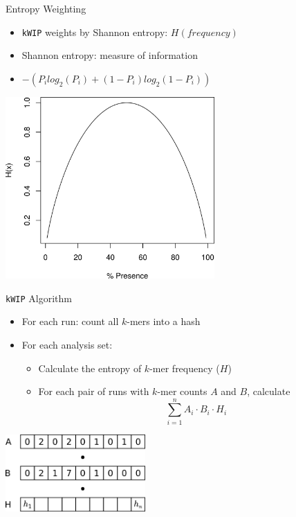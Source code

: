 \documentclass[t]{beamer}
\begin{document}
\begin{frame}{Entropy Weighting}
  \begin{itemize}
    \item \texttt{kWIP} weights by Shannon entropy: $H(frequency)$
    \item Shannon entropy: measure of information
    \item $-(P_i log_2(P_i) + (1-P_i) log_2(1-P_i))$
  \end{itemize}
  \begin{center}
    \includegraphics[width=0.6\textwidth]{img/shanent.png}
  \end{center}
\end{frame}

\begin{frame}{\texttt{kWIP} Algorithm}
  \begin{itemize}
    \item For each run: count all $k$-mers into a hash
    \item For each analysis set:
      \begin{itemize}
        \item Calculate the entropy of $k$-mer frequency ($H$)
        \item For each pair of runs with $k$-mer counts $A$ and $B$, calculate
          $$\sum\limits^{n}_{i=1} A_i \cdot B_i \cdot H_i$$
      \end{itemize}
  \end{itemize}
  \begin{center}
    \includegraphics[width=0.4\textwidth]{img/hash-wip.png}
  \end{center}
\end{frame}
\end{document}
